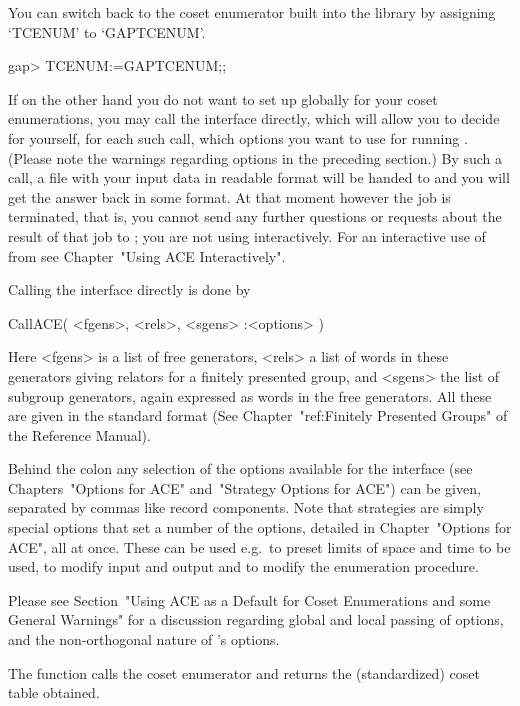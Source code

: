 You can switch back to the coset  enumerator  built  into  the  {\GAP}
library by assigning `TCENUM' to `GAPTCENUM'.

\begintt
gap> TCENUM:=GAPTCENUM;;
\endtt


If on  the other hand you  do not want  to set up {\ACE}  globally for
your coset  enumerations, you may call the  {\ACE} interface directly,
which will allow you to decide for yourself, for each such call, which
options you  want to use for running {\ACE}. (Please note the warnings
regarding options in the preceding section.)  By such a call,  a  file
with  your input  data in  {\ACE} readable  format will  be  handed to
{\ACE} and you will get the answer back in some {\GAP} format. At that
moment however the {\ACE} job  is terminated, that is, you cannot send
any  further questions or  requests about  the result  of that  job to
{\ACE}; you  are not using  {\ACE} interactively.  For  an interactive
use of {\ACE} from {\GAP} see Chapter~"Using ACE Interactively".

Calling the {\ACE} interface directly is done by

\>CallACE( <fgens>, <rels>, <sgens> :<options> )

Here <fgens> is  a list of free generators, <rels> a  list of words in
these generators  giving relators for a finitely  presented group, and
<sgens> the list  of subgroup generators, again expressed  as words in
the free generators. All these are given in the standard {\GAP} format
(See Chapter~"ref:Finitely  Presented Groups" of  the {\GAP} Reference
Manual).

Behind the colon any  selection  of  the  options  available  for  the
interface (see Chapters~"Options for ACE" and~"Strategy
Options for ACE") can be  given,  separated  by  commas
like record  components.  Note  that  strategies  are  simply  special
options that set a number of the options, detailed in Chapter~"Options
for ACE", all at once. These can be used e.g.~to preset
limits of space and time to be used, to modify input and output and to
modify the enumeration procedure.

Please  see Section~"Using ACE as a Default for Coset Enumerations and 
some General Warnings" for a discussion  regarding  global  and  local
passing of options, and the non-orthogonal nature of {\ACE}'s options.

The  function   calls the  {\ACE}  coset  enumerator  and returns  the
(standardized) coset table obtained.

